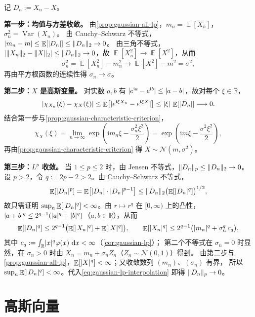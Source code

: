 \documentclass[UTF8,11pt,a4paper,oneside,fontset=fandol]{ctexrep}
\makeatletter
\numberwithin{equation}{section}
\theoremstyle{zhthm}
\renewenvironment{proof}[1][\proofname]{\par
  \pushQED{\qed}%
  \normalfont\topsep6\p@\@plus6\p@\relax
  \trivlist
  \item[\hskip\labelsep\bfseries#1\hspace{0.5em}]\ignorespaces
}{%
  \popQED\endtrivlist\@endpefalse
}
\renewcommand{\proofname}{证明}
\newcommand{\R}{\mathbb{R}}
\DeclareMathOperator{\E}{\mathbb{E}}
\DeclareMathOperator{\Var}{Var}
\newcommand{\Normal}{\mathcal{N}}
\newcommand{\iu}{\mathrm{i}}
\newcommand{\dd}{\mathop{}\!\mathrm{d}}
\DeclarePairedDelimiter{\abs}{\lvert}{\rvert}
\DeclarePairedDelimiter{\norm}{\lVert}{\rVert}
\makeatother
\begin{document}
\begin{proof}
记 $D_n:=X_n-X$。

\textbf{第一步：均值与方差收敛。}
由\cref{prop:gaussian-all-lp}，$m_n=\E[X_n]$，$\sigma_n^2=\Var(X_n)$。
由 Cauchy--Schwarz 不等式，$\abs{m_n-m}\le\E[\abs{D_n}]\le\norm{D_n}_2\to0$。
由三角不等式，$\abs{\norm{X_n}_2-\norm{X}_2}\le\norm{D_n}_2\to0$，故 $\E[X_n^2]\to\E[X^2]$，从而
\[
  \sigma_n^2=\E[X_n^2]-m_n^2\longrightarrow\E[X^2]-m^2=\sigma^2,
\]
再由平方根函数的连续性得 $\sigma_n\to\sigma$。

\textbf{\boldmath 第二步：$X$ 是高斯变量。}
对实数 $a,b$ 有 $\abs{e^{\iu a}-e^{\iu b}}\le\abs{a-b}$，故对每个 $\xi\in\R$，
\[
  \abs{\chi_{X_n}(\xi)-\chi_X(\xi)}
  \le\E\bigl[\abs{e^{\iu\xi X_n}-e^{\iu\xi X}}\bigr]
  \le\abs{\xi}\,\E[\abs{D_n}]\longrightarrow0.
\]
结合第一步与\cref{prop:gaussian-characteristic-criterion}，
\[
  \chi_X(\xi)=\lim_{n\to\infty}\exp\!\left(\iu m_n\xi-\frac{\sigma_n^2\xi^2}{2}\right)
  =\exp\!\left(\iu m\xi-\frac{\sigma^2\xi^2}{2}\right),
\]
再由\cref{prop:gaussian-characteristic-criterion} 得 $X\sim\Normal(m,\sigma^2)$。

\textbf{\boldmath 第三步：$L^p$ 收敛。}
当 $1\le p\le2$ 时，由 Jensen 不等式，$\norm{D_n}_p\le\norm{D_n}_2\to0$。
设 $p>2$，令 $q:=2p-2>2$。由 Cauchy--Schwarz 不等式，
\begin{equation}
  \label{eq:gaussian-lp-interpolation}
  \E[\abs{D_n}^p]=\E\bigl[\abs{D_n}\cdot\abs{D_n}^{p-1}\bigr]
  \le\norm{D_n}_2\bigl(\E[\abs{D_n}^q]\bigr)^{1/2},
\end{equation}
故只需证明 $\sup_{n}\E[\abs{D_n}^q]<\infty$。由 $r\mapsto r^q$ 在 $[0,\infty)$ 上的凸性，
$\abs{a+b}^q\le2^{q-1}(\abs{a}^q+\abs{b}^q)$（$a,b\in\R$），从而
\[
  \E[\abs{D_n}^q]\le2^{q-1}\bigl(\E[\abs{X_n}^q]+\E[\abs{X}^q]\bigr),\qquad
  \E[\abs{X_n}^q]\le2^{q-1}\bigl(\abs{m_n}^q+\sigma_n^q\,c_q\bigr),
\]
其中 $c_q:=\int_{\R}\abs{x}^q\varphi(x)\,\dd x<\infty$（\cref{cor:gaussian-lp}）；
第二个不等式在 $\sigma_n=0$ 时显然，在 $\sigma_n>0$ 时由 $X_n=m_n+\sigma_nZ_n$（$Z_n\sim\Normal(0,1)$）得到。
由第二步与\cref{prop:gaussian-all-lp}，$\E[\abs{X}^q]<\infty$；又收敛数列 $(m_n)$、$(\sigma_n)$ 有界，
所以 $\sup_n\E[\abs{D_n}^q]<\infty$。代入\cref{eq:gaussian-lp-interpolation} 即得 $\norm{D_n}_p\to0$。
\end{proof}

\section{高斯向量}
\label{sec:gaussian-vectors}
\end{document}
